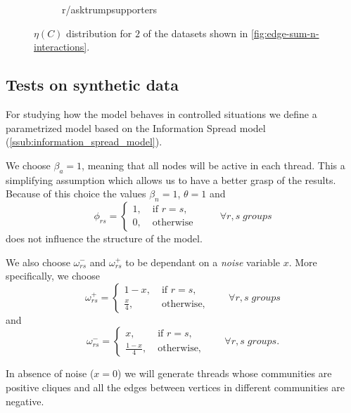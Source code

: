 \begin{figure}
\begin{center}
\begin{subfigure}[b]{0.4\textwidth}
			\caption{r/asktrumpsupporters}
			\label{fig:asktrump-hist-eta}
		\end{subfigure}
	\end{center}
	\caption{$\eta(C)$ distribution for $2$ of the datasets shown in
		\autoref{fig:edge-sum-n-interactions}.}
	\label{fig:eta-distribution-content}
\end{figure}

\subsection{Tests on synthetic data}%
\label{sub:testing_on_synthetic_data}

For studying how the model behaves in controlled situations we define a
parametrized model based on the Information Spread model
(\autoref{ssub:information_spread_model}).

We choose $\beta _{a} = 1$, meaning that all nodes will be active in each
thread. This a
simplifying assumption which allows us to have a better grasp of the results.
Because of this choice the values $\beta _n = 1$, $\theta = 1$ and
\begin{equation}
	\phi_{rs}  =
	\begin{cases}
		1, \; & \text{if } r = s, \\
		0, \; & \text{otherwise }
	\end{cases} \quad\quad \forall r,s \; groups
\end{equation}
does not influence the structure of the model.

We also choose $\omega ^{-} _{rs}$ and $\omega ^{+} _{rs} $ to be dependant on
a \emph{noise} variable $x$. More specifically, we choose
\begin{equation}
	\omega_{rs}^{+}   =
	\begin{cases}
		1 - x, \;        & \text{if } r = s, \\
		\frac{x}{4},  \; & \text{otherwise,}
	\end{cases} \quad\quad \forall r,s \; groups
\end{equation}
and
\begin{equation}
	\omega_{rs}^{-}   =
	\begin{cases}
		x, \;                & \text{if } r = s, \\
		\frac{1 - x}{4},  \; & \text{otherwise,}
	\end{cases} \quad\quad \forall r,s \; groups.
\end{equation}

In absence of noise ($x = 0$) we will generate threads whose communities are
positive cliques and all the edges between vertices in different communities
are negative.

